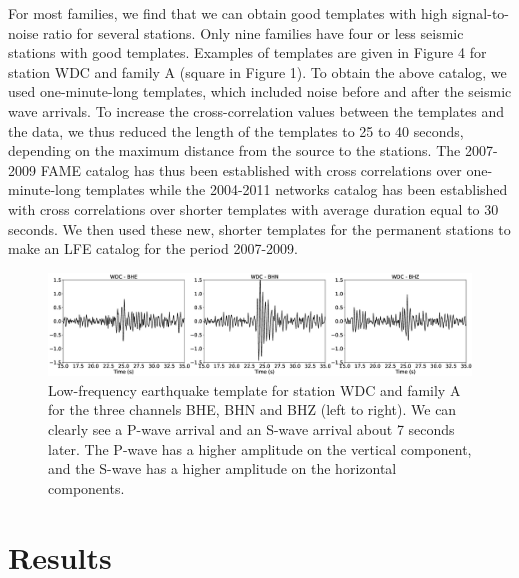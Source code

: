\documentclass[draft]{agujournal2019}
\begin{document}
For most families, we find that we can obtain good templates with high signal-to-noise ratio for several stations. Only nine families have four or less seismic stations with good templates. Examples of templates are given in Figure 4 for station WDC and family A (square in Figure 1). To obtain the above catalog, we used one-minute-long templates, which included noise before and after the seismic wave arrivals. To increase the cross-correlation values between the templates and the data, we thus reduced the length of the templates to 25 to 40 seconds, depending on the maximum distance from the source to the stations. The 2007-2009 FAME catalog has thus been established with cross correlations over one-minute-long templates while the 2004-2011 networks catalog has been established with cross correlations over shorter templates with average duration equal to 30 seconds. We then used these new, shorter templates for the permanent stations to make an LFE catalog for the period 2007-2009. \\

\begin{figure}
\noindent\includegraphics[width=\textwidth, trim={0cm 0cm 0cm 0cm},clip]{figures/templates.eps}
\caption{Low-frequency earthquake template for station WDC and family A for the three channels BHE, BHN and BHZ (left to right). We can clearly see a P-wave arrival and an S-wave arrival about 7 seconds later. The P-wave has a higher amplitude on the vertical component, and the S-wave has a higher amplitude on the horizontal components.}
\label{pngfiguresample}
\end{figure}

\section{Results}
\end{document}
